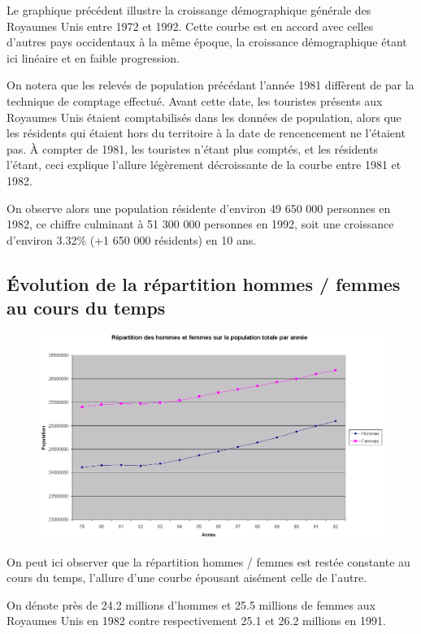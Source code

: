 Le graphique précédent illustre la croissange démographique générale des Royaumes Unis entre 1972 et 1992. Cette courbe est en accord avec celles d'autres pays occidentaux à la même époque, la croissance démographique étant ici linéaire et en faible progression.

On notera que les relevés de population précédant l'année 1981 diffèrent de par la technique de comptage effectué. Avant cette date, les touristes présents aux Royaumes Unis étaient comptabilisés dans les données de population, alors que les résidents qui étaient hors du territoire à la date de rencencement ne l'étaient pas. À compter de 1981, les touristes n'étant plus comptés, et les résidents l'étant, ceci explique l'allure légèrement décroissante de la courbe entre 1981 et 1982.

On observe alors une population résidente d'environ 49 650 000 personnes en 1982, ce chiffre culminant à 51 300 000 personnes en 1992, soit une croissance d'environ 3.32\% (+1 650 000 résidents) en 10 ans.
\pagebreak


\subsection{Évolution de la répartition hommes / femmes au cours du temps}
\begin{figure}[h!]
    \centering
    \includegraphics[width=\linewidth]{images/pop/repartitionHF.png}
\end{figure}

On peut ici observer que la répartition hommes / femmes est restée constante au cours du temps, l'allure d'une courbe épousant aisément celle de l'autre.

On dénote près de 24.2 millions d'hommes et 25.5 millions de femmes aux Royaumes Unis en 1982 contre respectivement 25.1 et 26.2 millions en 1991.

